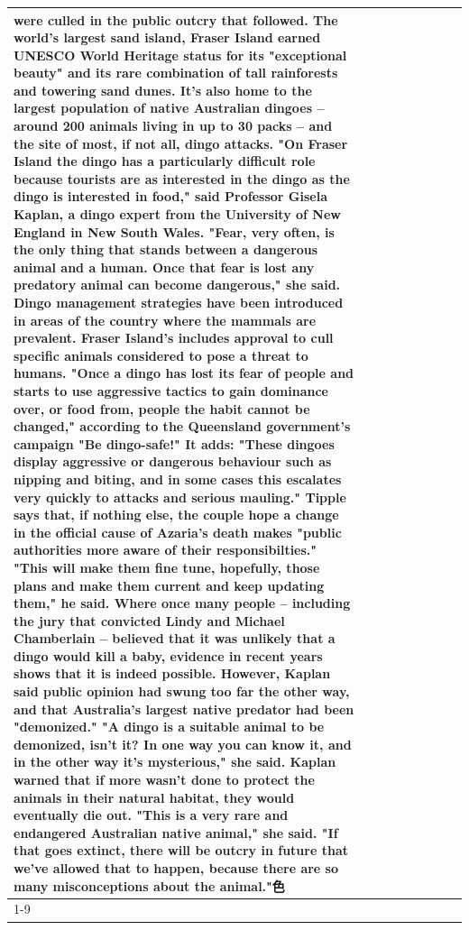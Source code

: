 \begin{table}[H]
\begin{tabular}{lllrlllll}
were culled in the public outcry that followed. The world's largest sand island, Fraser Island earned UNESCO World Heritage status for its "exceptional beauty" and its rare combination of tall rainforests and towering sand dunes. It's also home to the largest population of native Australian dingoes -- around 200 animals living in up to 30 packs -- and the site of most, if not all, dingo attacks. "On Fraser Island the dingo has a particularly difficult role because tourists are as interested in the dingo as the dingo is interested in food," said Professor Gisela Kaplan, a dingo expert from the University of New England in New South Wales. "Fear, very often, is the only thing that stands between a dangerous animal and a human. Once that fear is lost any predatory animal can become dangerous," she said. Dingo management strategies have been introduced in areas of the country where the mammals are prevalent. Fraser Island's includes approval to cull specific animals considered to pose a threat to humans. "Once a dingo has lost its fear of people and starts to use aggressive tactics to gain dominance over, or food from, people the habit cannot be changed," according to the Queensland government's campaign "Be dingo-safe!" It adds: "These dingoes display aggressive or dangerous behaviour such as nipping and biting, and in some cases this escalates very quickly to attacks and serious mauling." Tipple says that, if nothing else, the couple hope a change in the official cause of Azaria's death makes "public authorities more aware of their responsibilties." "This will make them fine tune, hopefully, those plans and make them current and keep updating them," he said. Where once many people -- including the jury that convicted Lindy and Michael Chamberlain -- believed that it was unlikely that a dingo would kill a baby, evidence in recent years shows that it is indeed possible. However, Kaplan said public opinion had swung too far the other way, and that Australia's largest native predator had been "demonized." "A dingo is a suitable animal to be demonized, isn't it? In one way you can know it, and in the other way it's mysterious," she said. Kaplan warned that if more wasn't done to protect the animals in their natural habitat, they would eventually die out. "This is a very rare and endangered Australian native animal," she said. "If that goes extinct, there will be outcry in future that we've allowed that to happen, because there are so many misconceptions about the animal."色 \\
\cline{1-9}

\end{tabular}
\end{table}
